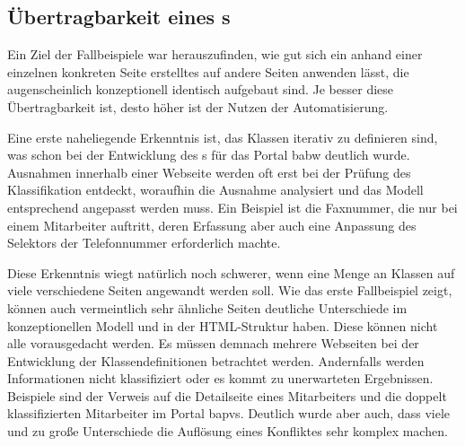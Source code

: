 \subsection{Übertragbarkeit eines {\classificationModel}s}
    Ein Ziel der Fallbeispiele war herauszufinden,
    wie gut sich ein anhand einer einzelnen konkreten Seite
    erstelltes {\classificationModel} auf andere Seiten anwenden lässt,
    die augenscheinlich konzeptionell identisch aufgebaut sind.
    Je besser diese Übertragbarkeit ist,
    desto höher ist der Nutzen der Automatisierung.

    Eine erste naheliegende Erkenntnis ist,
    das Klassen iterativ zu definieren sind,
    was schon bei der Entwicklung des {\classificationModel}s
    für das Portal \gls{babw} deutlich wurde.
    Ausnahmen innerhalb einer Webseite werden oft erst
    bei der Prüfung des Klassifikation entdeckt,
    woraufhin die Ausnahme analysiert und das Modell
    entsprechend angepasst werden muss.
    Ein Beispiel ist die Faxnummer, die nur bei einem Mitarbeiter auftritt,
    deren Erfassung aber auch eine Anpassung des Selektors der Telefonnummer
    erforderlich machte.

    Diese Erkenntnis wiegt natürlich noch schwerer,
    wenn eine Menge an Klassen auf viele verschiedene Seiten angewandt werden soll.
    Wie das erste Fallbeispiel zeigt,
    können auch vermeintlich sehr ähnliche Seiten deutliche Unterschiede
    im konzeptionellen Modell und in der HTML-Struktur haben.
    Diese können nicht alle vorausgedacht werden.
    Es müssen demnach mehrere Webseiten bei der Entwicklung der Klassendefinitionen
    betrachtet werden.
    Andernfalls werden Informationen nicht klassifiziert oder es kommt zu unerwarteten Ergebnissen.
    Beispiele sind der Verweis auf die Detailseite eines Mitarbeiters
    und die doppelt klassifizierten Mitarbeiter im Portal \gls{bapvs}.
    Deutlich wurde aber auch, dass viele und zu große Unterschiede
    die Auflösung eines Konfliktes sehr komplex machen.

